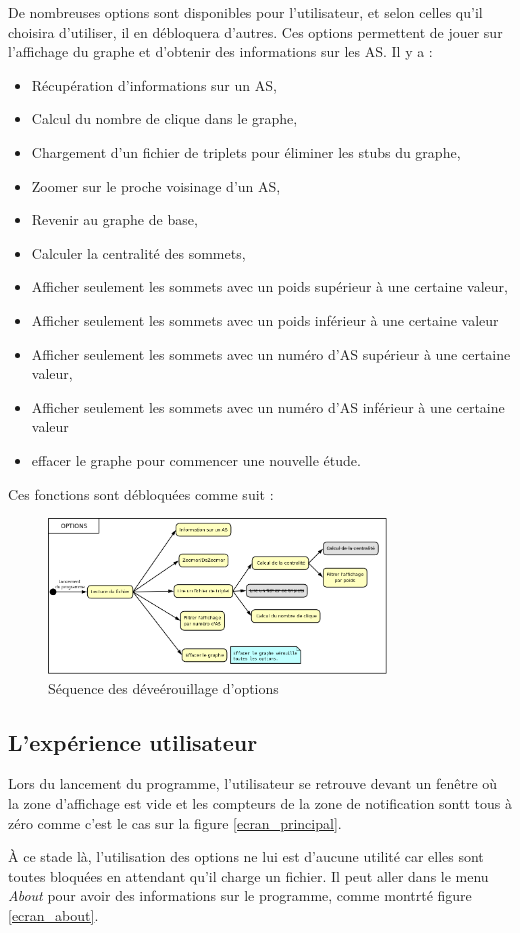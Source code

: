 \par
De nombreuses options sont disponibles pour l'utilisateur, et selon celles qu'il choisira d'utiliser, il en d\'ebloquera d'autres. Ces options permettent de jouer sur l'affichage du graphe et d'obtenir des informations sur les AS. Il y a :
\begin{itemize}
 \item R\'ecup\'eration d'informations sur un AS,
 \item Calcul du nombre de clique dans le graphe,
 \item Chargement d'un fichier de triplets pour \'eliminer les stubs du graphe,
 \item Zoomer sur le proche voisinage d'un AS,
 \item Revenir au graphe de base,
 \item Calculer la centralit\'e des sommets,
 \item Afficher seulement les sommets avec un poids sup\'erieur \`a une certaine valeur,
 \item Afficher seulement les sommets avec un poids inf\'erieur \`a une certaine valeur
 \item Afficher seulement les sommets avec un num\'ero d'AS sup\'erieur \`a une certaine valeur,
 \item Afficher seulement les sommets avec un num\'ero d'AS inf\'erieur \`a une certaine valeur
 \item effacer le graphe pour commencer une nouvelle \'etude.
\end{itemize}

Ces fonctions sont d\'ebloqu\'ees comme suit :

\begin{figure}[H]
\centering
 \includegraphics[width=0.8\textwidth]{./schema/seqMenu.png}
  \caption{\label{seq_option}S\'equence des d\'eve\'erouillage d'options}
\end{figure}


\subsection{L'exp\'erience utilisateur}
\par
Lors du lancement du programme, l'utilisateur se retrouve devant un fen\^etre o\`u la zone d'affichage est vide et les compteurs de la zone de notification sontt tous \`a z\'ero comme c'est le cas sur la figure \ref{ecran_principal}.
\par
\`A ce stade l\`a, l'utilisation des options ne lui est d'aucune utilit\'e car elles sont toutes bloqu\'ees en attendant qu'il charge un fichier. Il peut aller dans le menu \textit{About} pour avoir des informations sur le programme, comme montrt\'e figure \ref{ecran_about}.

